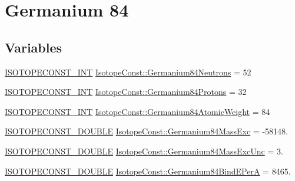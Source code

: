 \hypertarget{group___isotope_const-_germanium-_ge84}{}\section{Germanium 84}
\label{group___isotope_const-_germanium-_ge84}
\subsection*{Variables}
\begin{DoxyCompactItemize}
\item 
\mbox{\hyperlink{group___isotope_const-_macros_ga5f18360b3e99483a35c32d789e62621c}{I\+S\+O\+T\+O\+P\+E\+C\+O\+N\+S\+T\+\_\+\+I\+NT}} \mbox{\hyperlink{group___isotope_const-_germanium-_ge84_ga29216717d07c143e9f986cf472df5f5d}{Isotope\+Const\+::\+Germanium84\+Neutrons}} = 52
\item 
\mbox{\hyperlink{group___isotope_const-_macros_ga5f18360b3e99483a35c32d789e62621c}{I\+S\+O\+T\+O\+P\+E\+C\+O\+N\+S\+T\+\_\+\+I\+NT}} \mbox{\hyperlink{group___isotope_const-_germanium-_ge84_gaddf7bd04668b67534096247280924512}{Isotope\+Const\+::\+Germanium84\+Protons}} = 32
\item 
\mbox{\hyperlink{group___isotope_const-_macros_ga5f18360b3e99483a35c32d789e62621c}{I\+S\+O\+T\+O\+P\+E\+C\+O\+N\+S\+T\+\_\+\+I\+NT}} \mbox{\hyperlink{group___isotope_const-_germanium-_ge84_ga09f2df8f14cab45f95a4f417f1f99d8a}{Isotope\+Const\+::\+Germanium84\+Atomic\+Weight}} = 84
\item 
\mbox{\hyperlink{group___isotope_const-_macros_ga8f45a7272ce02c0b4c65c44636ed719a}{I\+S\+O\+T\+O\+P\+E\+C\+O\+N\+S\+T\+\_\+\+D\+O\+U\+B\+LE}} \mbox{\hyperlink{group___isotope_const-_germanium-_ge84_ga5d582bf86650ed7083ed77302cb929c4}{Isotope\+Const\+::\+Germanium84\+Mass\+Exc}} = -\/58148.
\item 
\mbox{\hyperlink{group___isotope_const-_macros_ga8f45a7272ce02c0b4c65c44636ed719a}{I\+S\+O\+T\+O\+P\+E\+C\+O\+N\+S\+T\+\_\+\+D\+O\+U\+B\+LE}} \mbox{\hyperlink{group___isotope_const-_germanium-_ge84_gaba962b0a0340ba06cded97f805db1a83}{Isotope\+Const\+::\+Germanium84\+Mass\+Exc\+Unc}} = 3.
\item 
\mbox{\hyperlink{group___isotope_const-_macros_ga8f45a7272ce02c0b4c65c44636ed719a}{I\+S\+O\+T\+O\+P\+E\+C\+O\+N\+S\+T\+\_\+\+D\+O\+U\+B\+LE}} \mbox{\hyperlink{group___isotope_const-_germanium-_ge84_gafc1a4e1984633d7a8735079287d9e03e}{Isotope\+Const\+::\+Germanium84\+Bind\+E\+PerA}} = 8465.
\item 

\end{DoxyCompactItemize}
